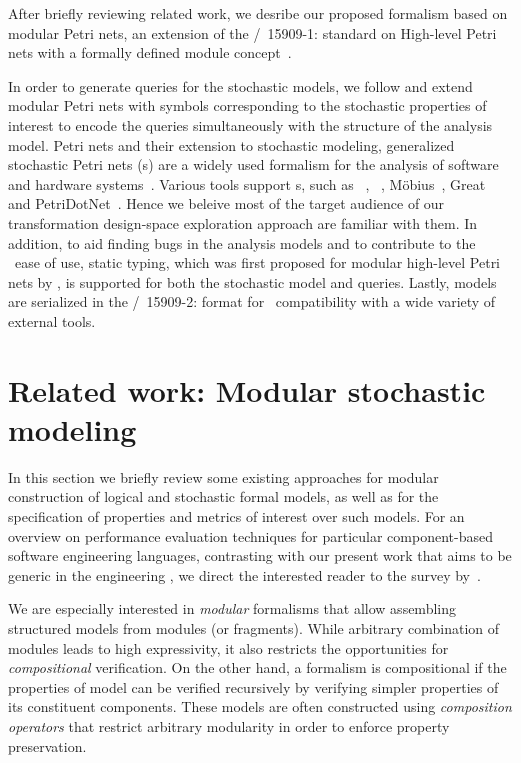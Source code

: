After briefly reviewing related work, we desribe our proposed formalism based on modular Petri nets, an extension of the /~15909-1:\citeyear{ISO1590912004} standard on High-level Petri nets with a formally defined module concept~\citep{Kindler09modular}.

In order to  generate queries for the stochastic models, we follow \citet{Kindler01modular} and extend modular Petri nets with symbols corresponding to the stochastic properties of interest to encode the queries simultaneously with the structure of the analysis model. Petri nets and their extension to stochastic modeling, generalized stochastic Petri nets (s) are a widely used formalism for the analysis of software and hardware systems~\citep{Murata89petri}. Various tools support s, such as ~\citep{Hirel00spnp}, ~\citep{Ciardo06smart}, M\"obius~\citep{Courtney09mobius}, Great~\citep{Babar10greatspn} and Petri\-Dot\-Net~\citep{Voros17pdn}. Hence we beleive most of the target audience of our transformation design-space exploration approach are familiar with them. In addition, to aid finding bugs in the analysis models and to contribute to the ~ease of use, static typing, which was first proposed for modular high-level Petri nets by \citet{Kindler07modular}, is supported for both the stochastic model and queries. Lastly, models are serialized in the /~15909-2:\citeyear{ISO1590922011}  format for ~compatibility with a wide variety of external tools.

\section{Related work: Modular stochastic modeling}

In this section we briefly review some existing approaches for modular construction of logical and stochastic formal models, as well as for the specification of properties and metrics of interest over such models. For an overview on performance evaluation techniques for particular component-based software engineering languages, contrasting with our present work that aims to be generic in the engineering , we direct the interested reader to the survey by~\citet{Koziolek10review}.

We are especially interested in \emph{modular} formalisms that allow assembling structured models from modules (or fragments). While arbitrary combination of modules leads to high expressivity, it also restricts the opportunities for \emph{compositional} verification. On the other hand, a formalism is compositional if the properties of model can be verified recursively by verifying simpler properties of its constituent components. These models are often constructed using \emph{composition operators} that restrict arbitrary modularity in order to enforce property preservation. 

